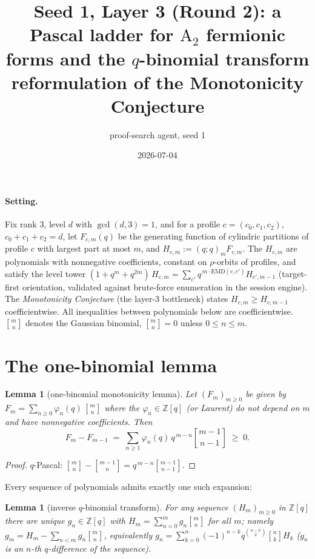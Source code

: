 \documentclass[11pt]{article}
\title{Seed 1, Layer 3 (Round 2): a Pascal ladder for $\mathrm{A}_2$ fermionic
forms and the $q$-binomial transform reformulation of the Monotonicity
Conjecture}
\author{proof-search agent, seed 1}
\date{2026-07-04}
\newtheorem{lemma}[theorem]{Lemma}
\newcommand{\qbin}[2]{\genfrac{[}{]}{0pt}{}{#1}{#2}}
\begin{document}
\maketitle

\paragraph{Setting.} Fix rank $3$, level $d$ with $\gcd(d,3)=1$, and for a
profile $c=(c_0,c_1,c_2)$, $c_0+c_1+c_2=d$, let $F_{c,m}(q)$ be the
generating function of cylindric partitions of profile $c$ with largest part
at most $m$, and $H_{c,m}:=(q;q)_m F_{c,m}$. The $H_{c,m}$ are polynomials
with nonnegative coefficients, constant on $\rho$-orbits of profiles, and
satisfy the level tower
$(1+q^m+q^{2m})\,H_{c,m}=\sum_{c'} q^{\,m\cdot\mathrm{EMD}(c,c')}H_{c',m-1}$
(target-first orientation, validated against brute-force enumeration in the
session engine). The \emph{Monotonicity Conjecture} (the layer-3 bottleneck)
states $H_{c,m}\geq H_{c,m-1}$ coefficientwise. All inequalities between
polynomials below are coefficientwise. $\qbin{m}{n}$ denotes the Gaussian
binomial, $\qbin{m}{n}=0$ unless $0\le n\le m$.

\section{The one-binomial lemma}

\begin{lemma}[one-binomial monotonicity lemma]\label{lem:onebinom}
Let $(F_m)_{m\ge 0}$ be given by
$F_m=\sum_{n\ge 0}\varphi_n(q)\,\qbin{m}{n}$
where the $\varphi_n\in\mathbb{Z}[q]$ (or Laurent) do not depend on $m$ and
have nonnegative coefficients. Then
\[
F_m-F_{m-1}\;=\;\sum_{n\ge 1}\varphi_n(q)\,q^{\,m-n}\qbin{m-1}{n-1}\;\ge\;0 .
\]
\end{lemma}
\begin{proof}
$q$-Pascal: $\qbin{m}{n}-\qbin{m-1}{n}=q^{\,m-n}\qbin{m-1}{n-1}$.
\end{proof}

Every sequence of polynomials admits exactly one such expansion:

\begin{lemma}[inverse $q$-binomial transform]\label{lem:invqbt}
For any sequence $(H_m)_{m\ge0}$ in $\mathbb{Z}[q]$ there are unique
$g_n\in\mathbb{Z}[q]$ with $H_m=\sum_{n=0}^m g_n\qbin{m}{n}$ for all $m$;
namely $g_m=H_m-\sum_{n<m}g_n\qbin{m}{n}$, equivalently
$g_n=\sum_{k=0}^n(-1)^{n-k}q^{\binom{n-k}{2}}\qbin{n}{k}H_k$
($g_n$ is an $n$-th $q$-difference of the sequence).
\end{lemma}
\end{document}
